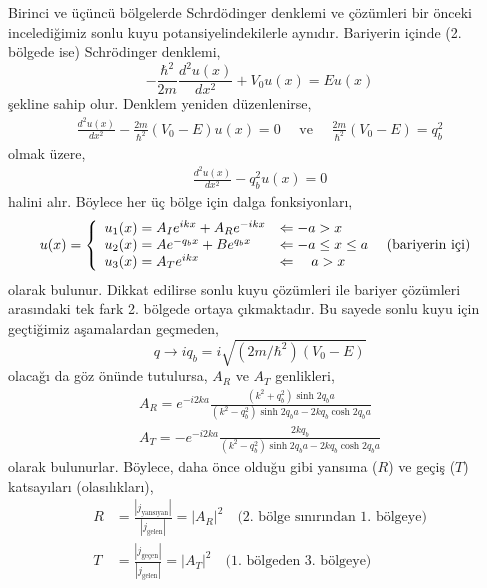 \documentclass[00_kitap.tex]{subfiles}
\begin{document}
Birinci ve üçüncü bölgelerde Schrdödinger denklemi ve çözümleri bir önceki incelediğimiz sonlu kuyu potansiyelindekilerle aynıdır. Bariyerin içinde (2. bölgede ise) Schrödinger denklemi, 
\begin{equation}
- \frac { \hbar ^ { 2 } } { 2 m } \frac { d ^ { 2 } u ( x ) } { d x ^ { 2 } } + V_0 u ( x ) = E u ( x )
\end{equation}
şekline sahip olur. Denklem yeniden düzenlenirse, 
\begin{align}
\frac { d ^ { 2 } u ( x ) } { d x ^ { 2 } } -  \frac { 2 m} { \hbar ^ { 2 } }  \left(V _ { 0 }-E \right) u ( x ) = 0 \quad \text{ ve } \quad \frac { 2 m} { \hbar ^ { 2 } }  \left(V _ { 0 } - E \right) = q_b ^ { 2 }
\end{align}
olmak üzere, 
\begin{align}
\frac { d ^ { 2 } u ( x ) } { d x ^ { 2 } } -  q_b^2 u ( x ) = 0
\end{align}
halini alır. Böylece her üç bölge için dalga fonksiyonları,
\begin{align}
u ( x )  = \left\{ 
\begin{array} { l l } 
{u_1(x) = A_I e^{i k x} + A_R e^{-i k x} } & {\Leftarrow -a > x } \\
{u_2(x) = A e^{- q_b x} + B e^{q_b x} } & {\Leftarrow -a \leq x \leq a } \quad \text{ (bariyerin içi)} \\
{u_3(x) = A_T e^{i k x}} & {\Leftarrow \quad a > x }
\end{array} \right. 
\end{align}
olarak bulunur. Dikkat edilirse sonlu kuyu çözümleri ile bariyer çözümleri arasındaki tek fark 2. bölgede ortaya çıkmaktadır. Bu sayede sonlu kuyu için geçtiğimiz aşamalardan geçmeden,
\begin{equation}
q \rightarrow i q_b = i \sqrt{\left(2 m / \hbar^{2}\right)\left(V_{0}-E\right)}
\end{equation}
olacağı da göz önünde tutulursa, $A_R$ ve $A_T$ genlikleri,
\begin{align}
{A_R= e^{-i 2 k a} \frac{\left(k^{2}+q_b^{2}\right) \sinh 2 q_b a}{\left(k^{2}-q_b^{2}\right) \sinh 2 q_b a - 2 k q_b \cosh 2 q_b a}} \\ 
{A_T= -e^{-i 2 k a} \frac{2 k q_b}{\left(k^{2}-q_b^{2}\right) \sinh 2 q_b a - 2 k q_b \cosh 2 q_b a}}
\end{align}
olarak bulunurlar. Böylece, daha önce olduğu gibi yansıma ($R$) ve geçiş ($T$) katsayıları (olasılıkları),
\begin{align}
R &= \frac{|j_\text{yansıyan}|}{|j_\text{gelen}|} = |A_R|^2 \quad \text{(2. bölge sınırından 1. bölgeye)}\\
T &= \frac{|j_\text{geçen}|}{|j_\text{gelen}|} = |A_T|^2  \quad \text{(1. bölgeden 3. bölgeye)}
\end{align}
\end{document}
